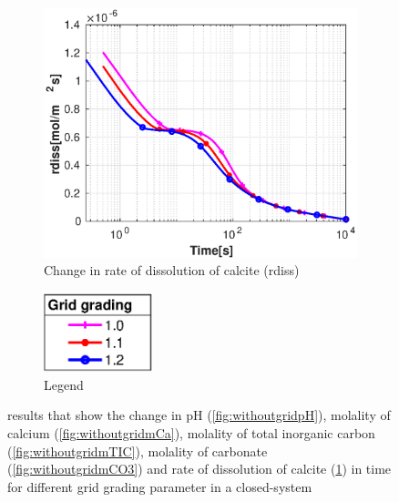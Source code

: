 \begin{figure}[!h]
\begin{subfigure}{.5\linewidth}
    \end{subfigure}%
    \hfill
    \begin{subfigure}{.5\linewidth}
            \centering
        \includegraphics[width=\textwidth]{PICTURES/without_grid_rdiss.eps}
        \caption{Change in rate of dissolution of calcite (rdiss)}
        \label{fig:withoutgridrdiss}
    \end{subfigure}%
  \hfill
  \begin{subfigure}{.5\linewidth}
            \centering
        \includegraphics[width=0.35\textwidth]{PICTURES/with_grid_legend.eps}
        \caption{Legend}
        \label{fig:withoutgridlegend}
    \end{subfigure}%
    \caption{\DuMuX results that show the change in pH (\cref{fig:withoutgridpH}), molality of calcium (\cref{fig:withoutgridmCa}), 
    molality of total inorganic carbon (\cref{fig:withoutgridmTIC}), molality of carbonate (\cref{fig:withoutgridmCO3}) 
    and rate of dissolution of calcite (\cref{fig:withoutgridrdiss}) in time for different grid grading parameter in a closed-system} 
    \label{fig:comparisionWithoutDiffgrid}
\end{figure}

